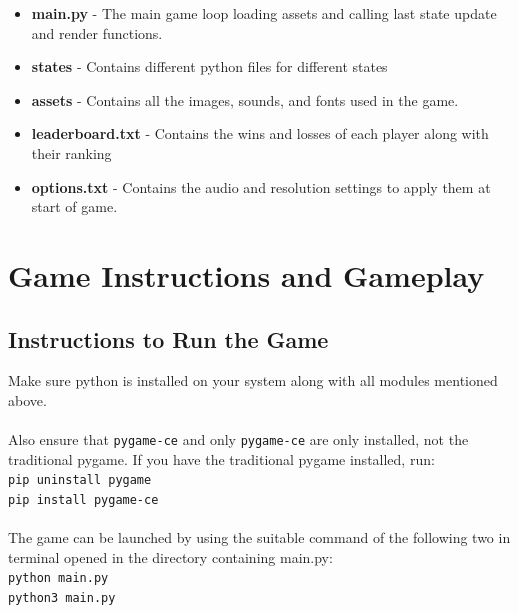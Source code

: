 \documentclass[10.5pt]{article}
\begin{document}

    \begin{itemize}
        \item \textbf{main.py} - The main game loop loading assets and calling last state update and render functions.
        \item \textbf{states} - Contains different python files for different states
        \item \textbf{assets} - Contains all the images, sounds, and fonts used in the game.
        \item \textbf{leaderboard.txt} - Contains the wins and losses of each player along with their ranking
        \item \textbf{options.txt} - Contains the audio and resolution settings to apply them at start of game.
    \end{itemize}
    
\vspace{1cm}
\section{Game Instructions and Gameplay}
\subsection{Instructions to Run the Game}
Make sure python is installed on your system along with all modules mentioned above. \\ \\
Also ensure that \texttt{pygame-ce} and only \texttt{pygame-ce} are only installed, not the traditional pygame.
    If you have the traditional pygame installed, run: \\
    \texttt{pip uninstall pygame} \\
    \texttt{pip install pygame-ce} \\ \\
The game can be launched by using the suitable command of the following two in terminal opened in the directory containing main.py: \\
    \texttt{python main.py} \\
    \texttt{python3 main.py} \\
\end{document}
